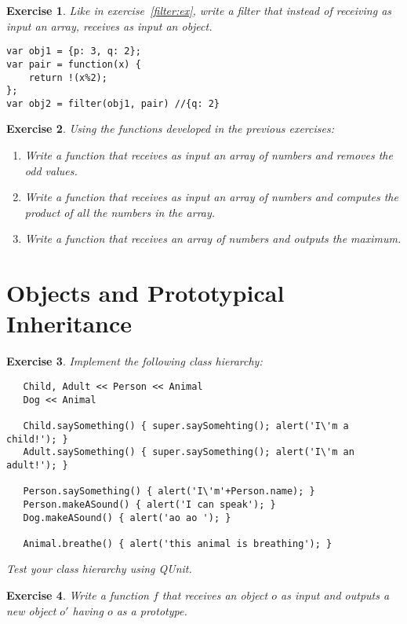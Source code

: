 \documentclass{article}
\newtheorem{ex}{Exercise}[section]
\begin{document}
\begin{ex}
Like in exercise~\ref{filter:ex}, write a filter that instead of receiving as input 
an array, receives as input an object.  
\begin{verbatim}
var obj1 = {p: 3, q: 2}; 
var pair = function(x) { 
	return !(x%2); 
}; 
var obj2 = filter(obj1, pair) //{q: 2} 
\end{verbatim}
\end{ex} 

\begin{ex} 
Using the functions developed in the previous exercises: 
\begin{enumerate}
   \item Write a function that receives as input an array of numbers and removes 
         the odd values. 
   \item Write a function that receives as input an array of numbers and computes 
         the product of all the numbers in the array. 
   \item Write a function that receives an array of numbers 
         and outputs the maximum. 
\end{enumerate}
\end{ex} 


\section{Objects and Prototypical Inheritance} 

\begin{ex} 
Implement the following class hierarchy: 
\begin{verbatim}
   Child, Adult << Person << Animal 
   Dog << Animal   
   
   Child.saySomething() { super.saySomehting(); alert('I\'m a child!'); }  
   Adult.saySomething() { super.saySomething(); alert('I\'m an adult!'); }
   
   Person.saySomething() { alert('I\'m'+Person.name); } 
   Person.makeASound() { alert('I can speak'); } 
   Dog.makeASound() { alert('ao ao '); }
   
   Animal.breathe() { alert('this animal is breathing'); }   
\end{verbatim} 
Test your class hierarchy using QUnit.  
\end{ex} 

\begin{ex}
Write a function $f$ that receives an object $o$ as input and outputs a new 
object $o'$ having $o$ as a prototype.  
\end{ex} 
\end{document}
